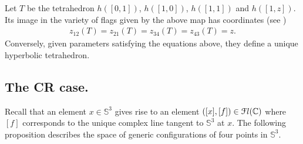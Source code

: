 Let $T$ be the tetrahedron $h([0,1])$, $h([1,0])$, $h([1,1])$ and $h([1,z])$.  Its image in the
variety of flags given by the above map has coordinates (see \cite{BFG})
\begin{eqnarray}
 z_{12}(T) = z_{21}(T)=z_{34}(T)=z_{43}(T)=z.\label{eq:hyp}
 \end{eqnarray}
Conversely, given parameters satisfying the equations above, they define a unique hyperbolic tetrahedron.

\subsection{The CR case.}\label{CR}


Recall that an element $x\in {\mathbb S}^3$ gives rise to an element  $([x],[f])\in \mathcal{F}l(\mathbb{C})$ where $[f]$ corresponds to the unique complex line tangent to ${\mathbb S}^3$ at $x$.
The following proposition  describes the space of
generic configurations of four points in ${\mathbb S}^3$.

